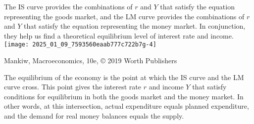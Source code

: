 \documentclass[10pt]{article}
\begin{document}
The IS curve provides the combinations of $r$ and $Y$ that satisfy the equation representing the goods market, and the LM curve provides the combinations of $r$ and $Y$ that satisfy the equation representing the money market. In conjunction, they help us find a theoretical equilibrium level of interest rate and income.\\
\texttt{[image: 2025\_01\_09\_7593560eaab777c722b7g-4]}

Mankiw, Macroeconomics, 10e, © 2019 Worth Publishers

The equilibrium of the economy is the point at which the IS curve and the LM curve cross. This point gives the interest rate $r$ and income $Y$ that satisfy conditions for equilibrium in both the goods market and the money market. In other words, at this intersection, actual expenditure equals planned expenditure, and the demand for real money balances equals the supply.
\end{document}
